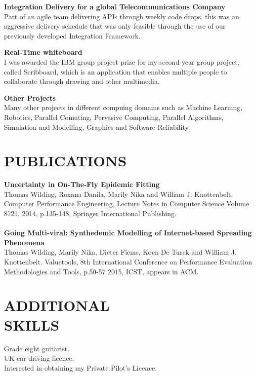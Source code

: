 \documentclass[margin, 10pt]{res} %
\begin{document}
\begin{resume}
\textbf{Integration Delivery for a global Telecommunications Company} \\
Part of an agile team delivering APIs through weekly code drops, this was an aggressive delivery schedule that was only feasible through the use of our previously developed Integration Framework.

\textbf{Real-Time whiteboard} \\
I was awarded the IBM group project prize for my second year group project, called Scribboard, which is an application that enables multiple people to collaborate through drawing and other multimedia.

\textbf{Other Projects} \\
Many other projects in different compuing domains such as Machine Learning, Robotics, Parallel Comuting, Pervasive Computing, Parallel Algorithms, Simulation and Modelling, Graphics and Software Reliability.

\section{PUBLICATIONS} 

\textbf{Uncertainty in On-The-Fly Epidemic Fitting}\\
Thomas Wilding, Roxana Danila, Marily Nika and William J. Knottenbelt. Computer Performance Engineering, Lecture Notes in Computer Science Volume 8721, 2014, p.135-148, Springer International Publishing. \\\\
\textbf{Going Multi-viral: Synthedemic Modelling of Internet-based Spreading Phenomena}\\
Thomas Wilding, Marily Nika, Dieter Fiems, Koen De Turck and William J. Knottenbelt. Valuetools, 8th International Conference on Performance Evaluation Methodologies and Tools, p.50-57 2015, ICST, appears in ACM.



\section{ADDITIONAL \\ SKILLS} 

Grade eight guitarist. \\
UK car driving licence. \\
Interested in obtaining my Private Pilot’s Licence.\\


\end{resume}
\end{document}

